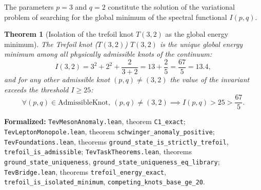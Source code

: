 \documentclass[11pt,a4paper]{article}
\newtheorem{theorem}{Theorem}
\theoremstyle{definition}
\theoremstyle{remark}
\begin{document}
The parameters $p=3$ and $q=2$ constitute the solution of the variational problem of searching for the global minimum of the spectral functional $I(p,q)$.
	
\begin{theorem}[Isolation of the trefoil knot $T(3,2)$ as the global energy minimum]
\label{thm:trefoil_uniqueness}
The Trefoil knot ($T(3,2)$) $T(3,2)$ is the unique global energy minimum among all physically admissible knots of the continuum:
\begin{equation}
	I(3, 2) = 3^2 + 2^2 + \frac{2}{3 + 2} = 13 + \frac{2}{5} = \frac{67}{5} = 13.4,
	\label{eq:trefoil_energy_exact}
\end{equation}
and for any other admissible knot $(p, q) \ne (3, 2)$ the value of the invariant exceeds the threshold $I \ge 25$:
\begin{equation}
	\forall (p, q) \in \mathrm{AdmissibleKnot}, \ (p, q) \ne (3, 2) \implies I(p, q) > 25 > \frac{67}{5}.
	\label{eq:trefoil_competitor_bound}
\end{equation}
\end{theorem}

\noindent\small\textbf{Formalized:} \texttt{TevMesonAnomaly.lean}, theorem \texttt{C1_exact}; \texttt{TevLeptonMonopole.lean}, theorem \texttt{schwinger_anomaly_positive};
\texttt{TevFoundations.lean}, theorems \texttt{ground_state_is_strictly_trefoil}, \texttt{trefoil\_is\_admissible}; \texttt{TevTaskTheorems.lean}, theorems \texttt{ground\_state\_uniqueness}, \texttt{ground\_state\_uniqueness\_eq\_library}; \texttt{TevBridge.lean}, theorems \texttt{trefoil_energy_exact}, \texttt{trefoil_is_isolated_minimum}, \texttt{competing_knots_base_ge_20}.
\end{document}
